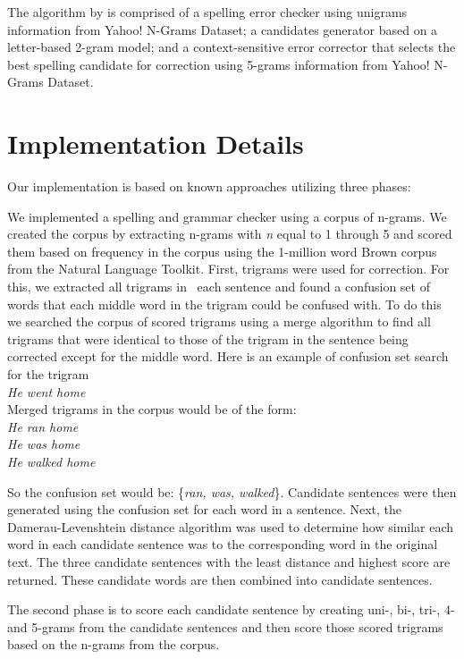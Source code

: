 \documentclass[twocolumn]{article}
\newcommand{\tab}{\hspace*{2em}}
\begin{document}
The algorithm by \cite{Bassil12} is comprised of a spelling error checker using
unigrams information from Yahoo! N-Grams Dataset; a candidates generator based
on a letter-based 2-gram model; and a context-sensitive error corrector that
selects the best spelling candidate for correction using 5-grams information
from Yahoo! N-Grams Dataset.

\section{Implementation Details}
Our implementation is based on known approaches utilizing three phases:

We implemented a spelling and grammar checker using a corpus of n-grams. We
created the corpus by extracting n-grams with \textit{n} equal to 1 through 5 and scored
them based on frequency in the corpus using the 1-million word Brown corpus from
the Natural Language Toolkit.
First, trigrams were used for correction. For this, we extracted all trigrams in
 each sentence and found a confusion set of words that each middle word in the
trigram could be confused with. To do this we searched the corpus of scored
trigrams using a merge algorithm to find all trigrams that were identical to
those of the trigram in the sentence being corrected except for the middle word.
Here is an example of confusion set search for the trigram
\\
\newline
\tab\tab\textit{He went home}
\\\newline
Merged trigrams in the corpus would be of the form:
\\\newline
\tab\tab\textit{He ran home} \\
\tab\tab\textit{He was home} \\
\tab\tab\textit{He walked home}
\newline

So the confusion set would be: \{\textit{ran, was, walked}\}. Candidate sentences
were then generated using the confusion set for each word in a sentence. Next,
the Damerau-Levenshtein distance \cite{damerau64,levenshtein66} algorithm was
used to determine how similar each word in each candidate sentence was to the
corresponding word in the original text. The three candidate sentences with the
least distance and highest score are returned. These candidate words are then
combined into candidate sentences.

The second phase is to score each candidate sentence by creating uni-, bi-,
tri-, 4- and 5-grams from the candidate sentences and then score those scored
trigrams based on the n-grams from the corpus.
\end{document}
